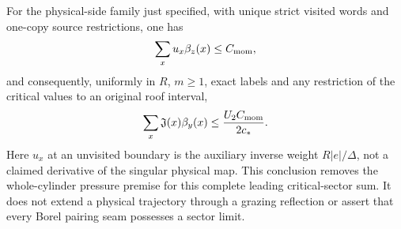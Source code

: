 \begin{theorem}
\label{thm:mc-critical-sectors}
For the physical-side family just specified, with unique strict
visited words and one-copy source restrictions, one has
\begin{equation}\label{eq:mc-sector-momentum}
 \sum_x u_x\beta_z(x)\le C_{\rm mom},
\end{equation}
and consequently, uniformly in $R$, $m\ge1$, exact labels and any
restriction of the critical values to an original roof interval,
\begin{equation}\label{eq:mc-critical-sectors}
 \sum_x\mathfrak J(x)\beta_y(x)
                       \le\frac{U_2 C_{\rm mom}}{2c_*}.
\end{equation}
Here $u_x$ at an unvisited boundary is the auxiliary inverse weight
$R|e|/\Delta$, not a claimed derivative of the singular physical map.
This conclusion removes the whole-cylinder pressure premise for this
complete leading critical-sector sum. It does not extend a physical
trajectory through a grazing reflection or assert that every Borel
pairing seam possesses a sector limit.
\end{theorem}
